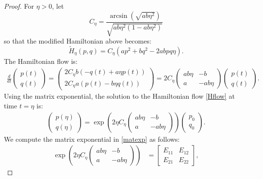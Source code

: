 \documentclass[10pt,a4paper]{amsart}
\begin{document}
\begin{proof}
    For $\eta > 0$, let
$$C_\eta = \frac{\arcsin(\sqrt{ab\eta^2})}{\sqrt{ab\eta^2(1-ab\eta^2)}}$$
so that the modified Hamiltonian above becomes:
$$\tilde H_\eta(p,q) = C_\eta (ap^2+bq^2-2abpq\eta).$$
The Hamiltonian flow is:
\begin{align}
    \frac{d}{dt} \begin{pmatrix}
        p(t) \\ q(t)
    \end{pmatrix}
    = \begin{pmatrix}
        2C_\eta b (-q(t) + a\eta p(t)) \\ 
        2C_\eta a (p(t) - b\eta q(t))
    \end{pmatrix}
    = 2C_\eta 
    \begin{pmatrix}
        ab\eta & -b \\
        a & -ab\eta
    \end{pmatrix}
    \begin{pmatrix}
        p(t) \\ q(t)
    \end{pmatrix}.\label{Hflow}
\end{align}
Using the matrix exponential, the solution to the Hamiltonian flow \eqref{Hflow} at time $t=\eta$ is:
\begin{align}
    \begin{pmatrix}
        p(\eta) \\ q(\eta)
    \end{pmatrix}
    = \exp\left(2\eta C_\eta \begin{pmatrix}
        ab\eta & -b \\
        a & -ab\eta
    \end{pmatrix}\right) 
    \begin{pmatrix}
        p_0 \\ q_0
    \end{pmatrix}.    \label{matexp}
\end{align}
We compute the matrix exponential in \eqref{matexp} as follows:
\begin{align}
    \exp\left(2\eta C_\eta \begin{pmatrix}
        ab\eta & -b \\
        a & -ab\eta
    \end{pmatrix}\right) &=
    \begin{bmatrix}
        E_{11} & E_{12} \\
        E_{21} & E_{22}
    \end{bmatrix} \nonumber,

\end{align}
\end{proof}
\end{document}
